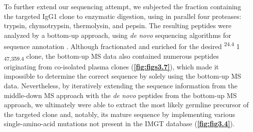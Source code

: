 To further extend our sequencing attempt, we subjected the fraction containing the targeted IgG1 clone to enzymatic digestion, using in parallel four proteases: trypsin, chymotrypsin, thermolysin, and pepsin. The resulting peptides were analyzed by a bottom-up approach, using \emph{de novo} sequencing algorithms for sequence annotation \cite{peng2021mass}. Although fractionated and enriched for the desired \textsuperscript{24.4} 1 \textsubscript{47,359.4} clone, the bottom-up MS data also contained numerous peptides originating from co-isolated plasma clones (\textbf{\autoref{fig:figs3.7}}), which made it impossible to determine the correct sequence by solely using the bottom-up MS data. Nevertheless, by iteratively extending the sequence information from the middle-down MS approach with the \emph{de novo} peptides from the bottom-up MS approach, we ultimately were able to extract the most likely germline precursor of the targeted clone and, notably, its mature sequence by implementing various single-amino-acid mutations not present in the IMGT database (\textbf{\autoref{fig:fig3.4}}).
